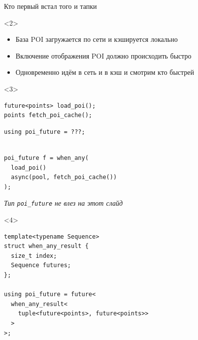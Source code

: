 \documentclass[aspectratio=169,pdf,hyperref={unicode},17pt]{beamer}
\begin{document}
\begin{frame}[fragile,t]{Кто первый встал того и тапки}
\begin{onlyenv}<2>
\begin{itemize}
 \item База POI загружается по сети и кэшируется локально
 \item Включение отображения POI должно происходить быстро
 \item Одновременно идём в сеть и в кэш и смотрим кто быстрей
\end{itemize}
\end{onlyenv}
\begin{onlyenv}<3>
\begin{lstlisting}[style=cppcode,aboveskip=0pt,belowskip=0pt]
future<points> load_poi();
points fetch_poi_cache();
\end{lstlisting}
\begin{lstlisting}[style=cppcode,backgroundcolor=\color{gray!30},aboveskip=0pt,belowskip=0pt]
using poi_future = ???;
\end{lstlisting}
\begin{lstlisting}[style=cppcode,aboveskip=0pt,belowskip=0pt]

poi_future f = when_any(
  load_poi()
  async(pool, fetch_poi_cache())
);
\end{lstlisting}
\textit{\footnotesize{Тип \texttt{poi\_future} не влез на этот слайд}}
\end{onlyenv}
\begin{onlyenv}<4>
\begin{lstlisting}[style=cppcode]
template<typename Sequence>
struct when_any_result {
  size_t index;
  Sequence futures;
};

using poi_future = future<
  when_any_result<
    tuple<future<points>, future<points>>
  >
>;
\end{lstlisting}
\end{onlyenv}
\end{frame}
\end{document}

